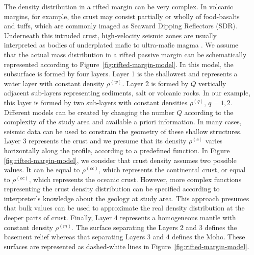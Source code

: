 \documentclass[manuscript,revised]{geophysics}
\begin{document}
The density distribution in a rifted margin can be very complex.
In volcanic margins, for example, the crust may consist partially or wholly of 
food-basalts and tuffs, which are commonly imaged as Seaward Dipping Reflectors (SDR).
Underneath this intruded crust, high-velocity seismic zones are usually interpreted 
as bodies of underplated mafic to ultra-mafic magma \citep{geoffroy2005}.
We assume that the actual mass distribution in a rifted passive margin can be 
schematically represented according to Figure~\ref{fig:rifted-margin-model}. 
In this model, the subsurface is formed by four layers. 
Layer 1 is the shallowest and represents a water layer with constant density
$\rho^{(w)}$. 
Layer 2 is formed by $Q$ vertically adjacent sub-layers representing 
sediments, salt or volcanic rocks.
In our example, this layer is formed by two sub-layers with constant densities
$\rho^{(q)}$, $q = 1, 2$. Different models can be created by changing the number $Q$
according to the complexity of the study area and available a priori information.
In many cases, seismic data can be used to constrain the geometry of these 
shallow structures.
Layer 3 represents the crust and we presume that its density $\rho^{(c)}$
varies horizontally along the profile, according to a predefined function.
In Figure \ref{fig:rifted-margin-model}, we consider that crust density assumes 
two possible values. It can be equal to $\rho^{(cc)}$, which
represents the continental crust, or equal to $\rho^{(oc)}$, which represents the
oceanic crust.
However, more complex functions representing the crust density distribution can be
specified according to interpreter's knowledge about the geology at study area.
This approach presumes that bulk values can be used 
to approximate the real density distribution at the deeper parts of crust. 
Finally, Layer 4 represents a homogeneous mantle with constant density $\rho^{(m)}$. 
The surface separating the Layers 2 and 3 defines the basement relief whereas
that separating Layers 3 and 4 defines the Moho. These surfaces are
represented as dashed-white lines in Figure~\ref{fig:rifted-margin-model}.
\end{document}
